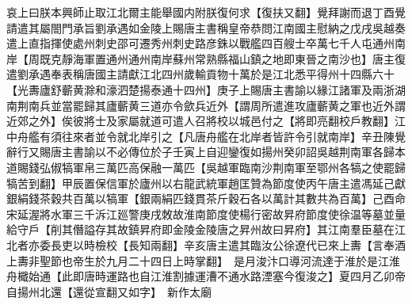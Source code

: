 哀上曰朕本興師止取江北爾主能舉國内附朕復何求【復扶又翻】覺拜謝而退丁酉覺請遣其屬閤門承旨劉承遇如金陵上賜唐主書稱皇帝恭問江南國主慰納之戊戌吳越奏遣上直指揮使處州刺史邵可遷秀州刺史路彦銖以戰艦四百艘士卒萬七千人屯通州南岸【周既克靜海軍置通州通州南岸蘇州常熟縣福山鎮之地即東晉之南沙也】唐主復遣劉承遇奉表稱唐國主請獻江北四州歲輸貢物十萬於是江北悉平得州十四縣六十【光夀廬舒蘄黄滁和濠泗楚揚泰通十四州】庚子上賜唐主書諭以緣江諸軍及兩浙湖南荆南兵並當罷歸其廬蘄黄三道亦令歛兵近外【謂周所遣進攻廬蘄黄之軍也近外謂近郊之外】俟彼將士及家屬就道可遣人召將校以城邑付之【將即亮翻校戶教翻】江中舟艦有須往來者並令就北岸引之【凡唐舟艦在北岸者皆許令引就南岸】辛丑陳覺辭行又賜唐主書諭以不必傳位於子壬寅上自迎鑾復如揚州癸卯詔吳越荆南軍各歸本道賜錢弘俶犒軍帛三萬匹高保融一萬匹【吳越軍臨南沙荆南軍至鄂州各犒之使罷歸犒苦到翻】甲辰置保信軍於廬州以右龍武統軍趙匡贊為節度使丙午唐主遣馮延己獻銀絹錢茶穀共百萬以犒軍【銀兩絹匹錢貫茶斤穀石各以萬計其數共為百萬】己酉命宋延渥將水軍三千泝江廵警庚戌敇故淮南節度使楊行密故昇府節度使徐温等墓並量給守戶【削其僭謚存其故鎮昇府即金陵金陵唐之昇州故曰昇府】其江南羣臣墓在江北者亦委長吏以時檢校【長知兩翻】辛亥唐主遣其臨汝公徐遼代已來上夀【言奉酒上夀非聖節也帝生於九月二十四日上時掌翻】　是月浚汴口導河流達于淮於是江淮舟檝始通【此即唐時運路也自江淮割據運漕不通水路湮塞今復浚之】夏四月乙卯帝自揚州北還【還從宣翻又如字】　新作太廟

